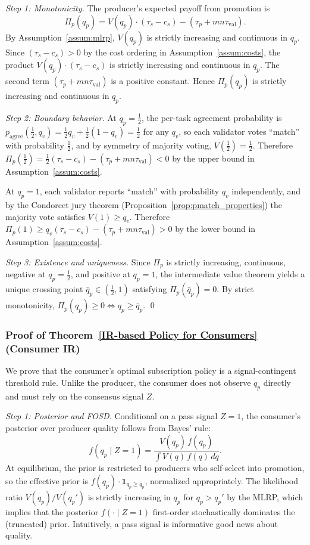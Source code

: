 \textit{Step 1: Monotonicity.} The producer's expected payoff from promotion is
\[
\Pi_p(q_p) = V(q_p) \cdot (\tau_s - c_s) - (\tau_p + mn\tau_{\text{val}}).
\]
By Assumption~\ref{assum:mlrp}, $V(q_p)$ is strictly increasing and continuous in $q_p$. Since $(\tau_s - c_s) > 0$ by the cost ordering in Assumption~\ref{assum:costs}, the product $V(q_p) \cdot (\tau_s - c_s)$ is strictly increasing and continuous in $q_p$. The second term $(\tau_p + mn\tau_{\text{val}})$ is a positive constant. Hence $\Pi_p(q_p)$ is strictly increasing and continuous in $q_p$.

\textit{Step 2: Boundary behavior.} At $q_p = \frac{1}{2}$, the per-task agreement probability is $p_{\text{agree}}(\frac{1}{2}, q_v) = \frac{1}{2}q_v + \frac{1}{2}(1-q_v) = \frac{1}{2}$ for any $q_v$, so each validator votes ``match'' with probability $\frac{1}{2}$, and by symmetry of majority voting, $V(\frac{1}{2}) = \frac{1}{2}$. Therefore $\Pi_p(\frac{1}{2}) = \frac{1}{2}(\tau_s - c_s) - (\tau_p + mn\tau_{\text{val}}) < 0$ by the upper bound in Assumption~\ref{assum:costs}.

At $q_p = 1$, each validator reports ``match'' with probability $q_v$ independently, and by the Condorcet jury theorem (Proposition~\ref{prop:pmatch_properties}) the majority vote satisfies $V(1) \geq q_v$. Therefore $\Pi_p(1) \geq q_v(\tau_s - c_s) - (\tau_p + mn\tau_{\text{val}}) > 0$ by the lower bound in Assumption~\ref{assum:costs}.

\textit{Step 3: Existence and uniqueness.} Since $\Pi_p$ is strictly increasing, continuous, negative at $q_p = \frac{1}{2}$, and positive at $q_p = 1$, the intermediate value theorem yields a unique crossing point $\bar{q}_p \in (\frac{1}{2}, 1)$ satisfying $\Pi_p(\bar{q}_p) = 0$. By strict monotonicity, $\Pi_p(q_p) \geq 0 \iff q_p \geq \bar{q}_p$. \qed


\subsubsection{Proof of Theorem~\ref{IR-based Policy for Consumers} (Consumer IR)}
\label{app:proof_consumer_ir}

We prove that the consumer's optimal subscription policy is a signal-contingent threshold rule. Unlike the producer, the consumer does not observe $q_p$ directly and must rely on the consensus signal $Z$.

\textit{Step 1: Posterior and FOSD.} Conditional on a pass signal $Z = 1$, the consumer's posterior over producer quality follows from Bayes' rule:
\[
f(q_p \mid Z = 1) = \frac{V(q_p)\,f(q_p)}{\int V(q)\,f(q)\,dq}.
\]
At equilibrium, the prior is restricted to producers who self-select into promotion, so the effective prior is $f(q_p) \cdot \mathbf{1}_{q_p \geq \bar{q}_p}$, normalized appropriately. The likelihood ratio $V(q_p) / V(q_p')$ is strictly increasing in $q_p$ for $q_p > q_p'$ by the MLRP, which implies that the posterior $f(\cdot \mid Z = 1)$ first-order stochastically dominates the (truncated) prior. Intuitively, a pass signal is informative good news about quality.

